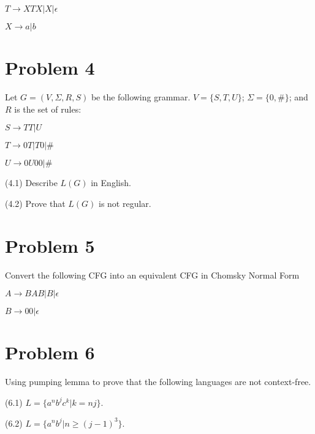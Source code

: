 \documentclass[11pt]{article}
\begin{document}
$T\rightarrow XTX|X|\epsilon$

$X\rightarrow a|b$
\newline

\section*{Problem 4}

\noindent
Let $G=(V,\Sigma,R,S)$ be the following grammar. $V=\{S,T,U\}$;
$\Sigma=\{0,\#\}$; and $R$ is the set of rules:

$S\rightarrow TT|U$

$T\rightarrow 0T|T0|\#$

$U\rightarrow 0U00|\#$

\noindent
(4.1) Describe $L(G)$ in English.
\newline

\noindent
(4.2) Prove that $L(G)$ is not regular.
\newline

\section*{Problem 5}

\noindent
Convert the following CFG into an equivalent CFG in Chomsky Normal Form

$A\rightarrow BAB|B|\epsilon$

$B\rightarrow 00|\epsilon$
\newline

\section*{Problem 6}

\noindent
Using pumping lemma to prove that the following languages are not
context-free.

(6.1) $L=\{a^nb^jc^k|k=nj\}$.
\newline

(6.2) $L=\{a^nb^j|n\geq (j-1)^3\}$.
\newline
\end{document}
